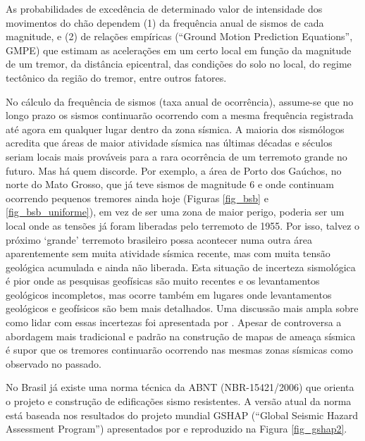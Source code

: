 \documentclass[jgrga]{agutex}
\begin{document}
\begin{article}
As probabilidades de excedência de determinado valor de intensidade dos movimentos do chão dependem (1) da frequência anual de sismos de cada magnitude, e (2) de relações empíricas (``Ground Motion Prediction Equations'', GMPE) que estimam as acelerações em um certo local em função da magnitude de um tremor, da distância epicentral, das condições do solo no local, do regime tectônico da região do tremor, entre outros fatores. 

No cálculo da frequência de sismos (taxa anual de ocorrência), assume-se que no longo prazo os sismos continuarão ocorrendo com a mesma frequência registrada até agora em qualquer lugar dentro da zona sísmica. A maioria dos sismólogos acredita que áreas de maior atividade sísmica nas últimas décadas e séculos seriam locais mais prováveis para a rara ocorrência de um terremoto grande no futuro. Mas há quem discorde. Por exemplo, a área de Porto dos Gaúchos, no norte do Mato Grosso, que já teve sismos de magnitude 6 e onde continuam ocorrendo pequenos tremores ainda hoje (Figuras \ref{fig_bsb} e \ref{fig_bsb_uniforme}), em vez de ser uma zona de maior perigo, poderia ser um local onde as tensões já foram liberadas pelo terremoto de 1955. Por isso, talvez o próximo ‘grande’ terremoto brasileiro possa acontecer numa outra área aparentemente sem muita atividade sísmica recente, mas com muita tensão geológica acumulada e ainda não liberada. Esta situação de incerteza sismológica é pior onde as pesquisas geofísicas são muito recentes e os levantamentos geológicos incompletos, mas ocorre também em lugares onde levantamentos geológicos e geofísicos são bem mais detalhados. Uma discussão mais ampla sobre como lidar com essas incertezas foi apresentada por \citet{assumpcao_2011}. Apesar de controversa a abordagem mais tradicional e padrão na construção de mapas de ameaça sísmica é supor que os tremores continuarão ocorrendo nas mesmas zonas sísmicas como observado no passado. 

No Brasil já existe uma norma técnica da ABNT (NBR-15421/2006) \citet{nbr_15421_2006} que orienta o projeto e construção de edificações sismo resistentes. A versão atual da norma está baseada nos resultados do projeto mundial GSHAP (``Global Seismic Hazard Assessment Program'') apresentados por \citet{shedlock_tanner_1999} e reproduzido na Figura \ref{fig_gshap2}. 


\end{article}
\end{document}
